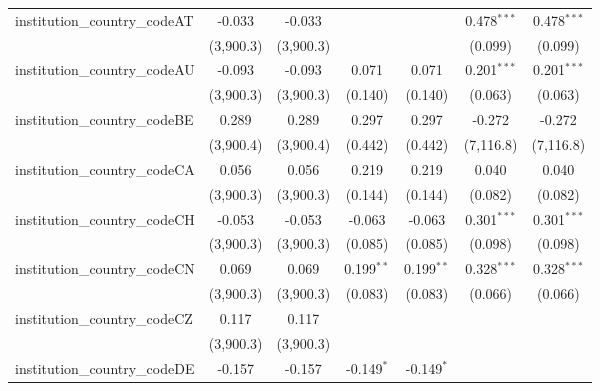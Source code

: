 \begin{tabular}{lcccccc}
   institution\_country\_codeAT          & -0.033         & -0.033         &               &               & 0.478$^{***}$  & 0.478$^{***}$\\   
                                         & (3,900.3)      & (3,900.3)      &               &               & (0.099)        & (0.099)\\   
   institution\_country\_codeAU          & -0.093         & -0.093         & 0.071         & 0.071         & 0.201$^{***}$  & 0.201$^{***}$\\   
                                         & (3,900.3)      & (3,900.3)      & (0.140)       & (0.140)       & (0.063)        & (0.063)\\   
   institution\_country\_codeBE          & 0.289          & 0.289          & 0.297         & 0.297         & -0.272         & -0.272\\   
                                         & (3,900.4)      & (3,900.4)      & (0.442)       & (0.442)       & (7,116.8)      & (7,116.8)\\   
   institution\_country\_codeCA          & 0.056          & 0.056          & 0.219         & 0.219         & 0.040          & 0.040\\   
                                         & (3,900.3)      & (3,900.3)      & (0.144)       & (0.144)       & (0.082)        & (0.082)\\   
   institution\_country\_codeCH          & -0.053         & -0.053         & -0.063        & -0.063        & 0.301$^{***}$  & 0.301$^{***}$\\   
                                         & (3,900.3)      & (3,900.3)      & (0.085)       & (0.085)       & (0.098)        & (0.098)\\   
   institution\_country\_codeCN          & 0.069          & 0.069          & 0.199$^{**}$  & 0.199$^{**}$  & 0.328$^{***}$  & 0.328$^{***}$\\   
                                         & (3,900.3)      & (3,900.3)      & (0.083)       & (0.083)       & (0.066)        & (0.066)\\   
   institution\_country\_codeCZ          & 0.117          & 0.117          &               &               &                &   \\   
                                         & (3,900.3)      & (3,900.3)      &               &               &                &   \\   
   institution\_country\_codeDE          & -0.157         & -0.157         & -0.149$^{*}$  & -0.149$^{*}$  &                &   \\   

\end{tabular}
